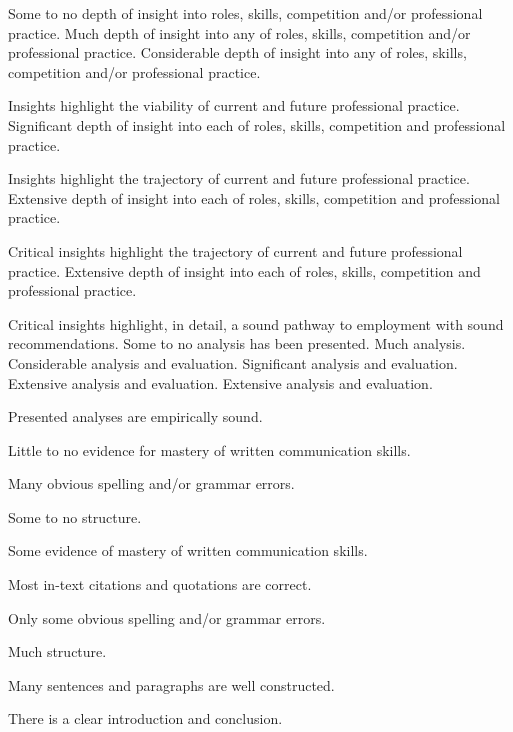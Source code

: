 \documentclass{../../fal_assignment}
\begin{document}
\begin{markingrubric}
        \grade  \fail	Some to no depth of insight into roles, skills, competition and/or professional practice.
        \grade 		Much depth of insight into any of roles, skills, competition and/or professional practice.
        \grade 		Considerable depth of insight into any of roles, skills, competition and/or professional practice.
        \par 		Insights highlight the viability of current and future professional practice.
        \grade 		Significant depth of insight into each of roles, skills, competition and professional practice.
        \par 		Insights highlight the trajectory of current and future professional practice.
        \grade 		Extensive depth of insight into each of roles, skills, competition and professional practice.
        \par 		Critical insights highlight the trajectory of current and future professional practice.
        \grade 		Extensive depth of insight into each of roles, skills, competition and professional practice.
        \par 		Critical insights highlight, in detail, a sound pathway to employment with sound recommendations.
%
        \grade  \fail	Some to no analysis has been presented.
        \grade 		Much analysis.
        \grade 		Considerable analysis and evaluation.
        \grade 		Significant analysis and evaluation.
        \grade 		Extensive analysis and evaluation.
        \grade 		Extensive analysis and evaluation.
        \par 		Presented analyses are empirically sound.
%
    
        \grade  \fail	Little to no evidence for mastery of written communication skills.
        \par 		Many obvious spelling and/or grammar errors.
        \par 		Some to no structure.
        
        \grade 		Some evidence of mastery of written communication skills.
        \par 		Most in-text citations and quotations are correct.
        \par 		Only some obvious spelling and/or grammar errors.
        \par 		Much structure.   
        \par 		Many sentences and paragraphs are well constructed.
        \par 		There is a clear introduction and conclusion.
        

\end{markingrubric}
\end{document}
